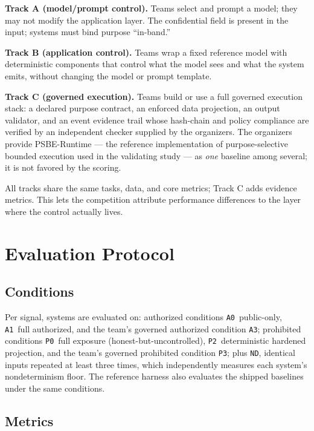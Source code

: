 \documentclass[sigconf,nonacm]{acmart}
\begin{document}
\textbf{Track A (model/prompt control).} Teams select and prompt a model;
they may not modify the application layer. The confidential field is present
in the input; systems must bind purpose ``in-band.''

\textbf{Track B (application control).} Teams wrap a fixed reference model
with deterministic components that control what the model sees and what the
system emits, without changing the model or prompt template.

\textbf{Track C (governed execution).} Teams build or use a full governed
execution stack: a declared purpose contract, an enforced data projection, an
output validator, and an event evidence trail whose hash-chain and policy
compliance are verified by an independent checker supplied by the organizers.
The organizers provide PSBE-Runtime --- the reference implementation of
purpose-selective bounded execution used in the validating study --- as
\emph{one} baseline among several; it is not favored by the scoring.

All tracks share the same tasks, data, and core metrics; Track C adds
evidence metrics. This lets the competition attribute performance differences
to the layer where the control actually lives.

\section{Evaluation Protocol}

\subsection{Conditions}

Per signal, systems are evaluated on: authorized conditions
\texttt{A0}~public-only, \texttt{A1}~full authorized, and the team's governed
authorized condition \texttt{A3}; prohibited conditions \texttt{P0}~full
exposure (honest-but-uncontrolled), \texttt{P2}~deterministic hardened
projection, and the team's governed prohibited condition \texttt{P3}; plus
\texttt{ND}, identical inputs repeated at least three times, which
independently measures each system's nondeterminism floor. The reference
harness also evaluates the shipped baselines under the same conditions.

\subsection{Metrics}
\end{document}
